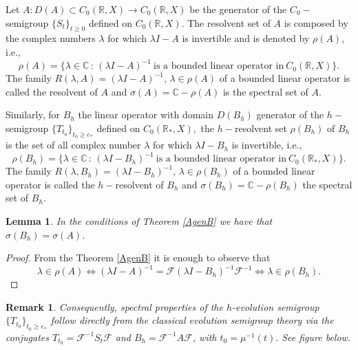 \documentclass[10pt]{amsart}
\newtheorem{lemma}{Lemma}
\numberwithin{equation}{section}
\newtheorem{Remark}{Remark}
\begin{document}
Let $A\colon D(A)\subset C_{0}(\mathbb{R},X)\to C_{0}(\mathbb{R},X)$ be the generator of the $C_0-$semigroup $\{S_t\}_{t \ge 0}$ defined on $C_0(\mathbb{R}, X).$ The resolvent set of $A$ is composed by the complex numbers $\lambda$ for which $\lambda I - A$ is invertible and is denoted by $\rho(A)$, i.e., 
$$
\rho(A) = \{ \lambda \in \mathbb{C} \, : \, (\lambda I - A)^{-1} \ \mbox{is a bounded linear operator in} \ C_0(\mathbb{R}, X) \}.
$$
The family $R(\lambda,A) = (\lambda I - A)^{-1}, \, \lambda \in \rho(A)$ of a bounded linear operator is called the resolvent of $A$ and $\sigma(A) = \mathbb{C}- \rho(A)$ is the spectral set of $A$.

\medskip

Similarly, for $B_h$  the linear operator with domain $D(B_h)$  generator of the $h-$semigroup $\{T_{t_0}\}_{t_0 \ge e_*}$ defined on $C_0(\mathbb{R}_*, X),$ the $h-$resolvent set $\rho(B_h)$ of $B_h$ is the set of all complex number $\lambda$ for which $\lambda I - B_h$ is invertible, i.e., 
$$
\rho(B_h) = \{ \lambda \in \mathbb{C} \, : \, (\lambda I - B_h)^{-1} \ \mbox{is a bounded linear operator in} \ C_0(\mathbb{R}_*, X) \}.
$$
The family $R(\lambda,B_h) = (\lambda I - B_h)^{-1}, \, \lambda \in \rho(B_h)$ of a bounded linear operator is called the $h-$resolvent of $B_h$ and $\sigma(B_h) = \mathbb{C}- \rho(B_h)$ the spectral set of $B_h$.

\begin{lemma}\label{espectros=}
In the conditions of Theorem \ref{AgenB} we have that $\sigma(B_h)=\sigma(A).$
\end{lemma}

\begin{proof}
From the Theorem  \ref{AgenB} it is enough to observe that 
$$
\lambda \in \rho(A) \iff (\lambda I - A)^{-1} = \mathcal{F} (\lambda I - B_h)^{-1} \mathcal{F}^{-1} \iff \lambda \in \rho(B_h).$$
\end{proof}



\begin{Remark}
Consequently, spectral properties of the \(h\)-evolution semigroup \(\{T_{t_0}\}_{t_0\ge e_*}\) follow directly from the classical evolution semigroup theory via the conjugates \(T_{t_0}= \mathcal{F}^{-1}S_t \mathcal{F}\) and \(B_h= \mathcal{F}^{-1}A\mathcal{F}\), with $t_0 = \mu^{-1}(t).$ See figure below.

\begin{center}
\end{center}

\end{Remark}
\end{document}
